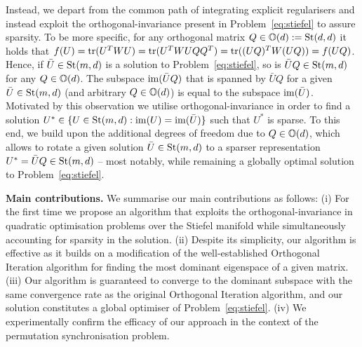 \documentclass{article}
\begin{document}
Instead, we depart from the common path of integrating explicit regularisers and instead exploit the orthogonal-invariance present in Problem~\eqref{eq:stiefel} to assure sparsity. To be more specific, for any orthogonal matrix $Q \in \mathbb{O}(d) := \operatorname{St}(d,d)$ it holds that $f(U) = \operatorname{tr}(U^T W U) = \operatorname{tr}(U^T W UQQ^T) = \operatorname{tr}((UQ)^T W (UQ)) = f(UQ)$. Hence, if $\bar{U} \in \operatorname{St}(m,d)$ is a solution to Problem~\eqref{eq:stiefel}, so is $\bar{U}Q \in \operatorname{St}(m,d)$ for any $Q \in \mathbb{O}(d)$. The subspace $\operatorname{im}(\bar{U}Q)$ that is spanned by $\bar{U}Q$ for a given $\bar{U} \in \operatorname{St}(m,d)$ (and arbitrary $Q \in \mathbb{O}(d)$) is equal to the subspace $\operatorname{im}(\bar{U})$.
Motivated by this observation  we  utilise orthogonal-invariance in order to find a solution  
%
$U^* \in \{ U \in \operatorname{St}(m,d) : \operatorname{im}(U) = \operatorname{im}(\bar{U})\}$ such that $U^*$ is sparse. To this end, we build upon the additional degrees of freedom due to $Q \in \mathbb{O}(d)$, which allows to rotate a given solution $\bar{U}\in \operatorname{St}(m,d)$ to a sparser representation $U^* = \bar{U} Q \in \operatorname{St}(m,d)$ -- most notably, while remaining a globally optimal solution to Problem~\eqref{eq:stiefel}.

\textbf{Main contributions.} We summarise our main contributions as follows: (i) For the first time we propose an algorithm that exploits the orthogonal-invariance in quadratic optimisation problems over the Stiefel manifold while simultaneously accounting for sparsity in the solution. (ii) Despite its simplicity, our algorithm is effective as it builds on a modification of the well-established Orthogonal Iteration algorithm for finding the most dominant eigenspace of a given matrix. (iii) Our algorithm is guaranteed to converge to the dominant subspace with the same convergence rate as the original Orthogonal Iteration algorithm, and our solution constitutes a global optimiser of Problem~\eqref{eq:stiefel}. (iv) We experimentally confirm the efficacy of our approach in the context of the permutation synchronisation problem.
\end{document}
